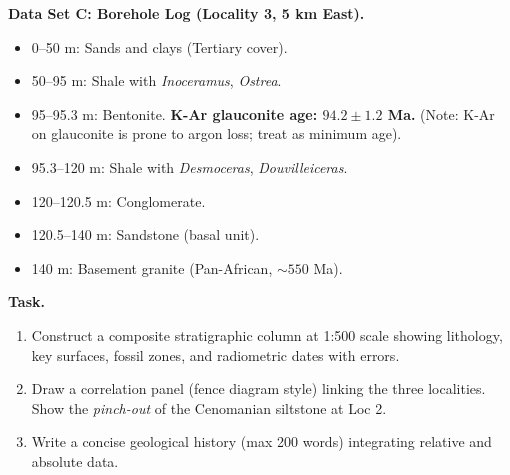 \documentclass[11pt]{article}
\begin{document}
\begin{experience}
\textbf{Data Set C: Borehole Log (Locality 3, 5 km East).}
\begin{itemize}
    \item 0--50 m: Sands and clays (Tertiary cover).
    \item 50--95 m: Shale with \emph{Inoceramus}, \emph{Ostrea}.
    \item 95--95.3 m: Bentonite. \textbf{K-Ar glauconite age: $94.2 \pm 1.2$ Ma.} (Note: K-Ar on glauconite is prone to argon loss; treat as minimum age).
    \item 95.3--120 m: Shale with \emph{Desmoceras}, \emph{Douvilleiceras}.
    \item 120--120.5 m: Conglomerate.
    \item 120.5--140 m: Sandstone (basal unit).
    \item 140 m: Basement granite (Pan-African, $\sim 550$ Ma).
\end{itemize}

\textbf{Task.} 
\begin{enumerate}
    \item Construct a composite stratigraphic column at 1:500 scale showing lithology, key surfaces, fossil zones, and radiometric dates with errors.
    \item Draw a correlation panel (fence diagram style) linking the three localities. Show the \emph{pinch-out} of the Cenomanian siltstone at Loc 2.
    \item Write a concise geological history (max 200 words) integrating relative and absolute data.
\end{enumerate}
\end{experience}
\end{document}

